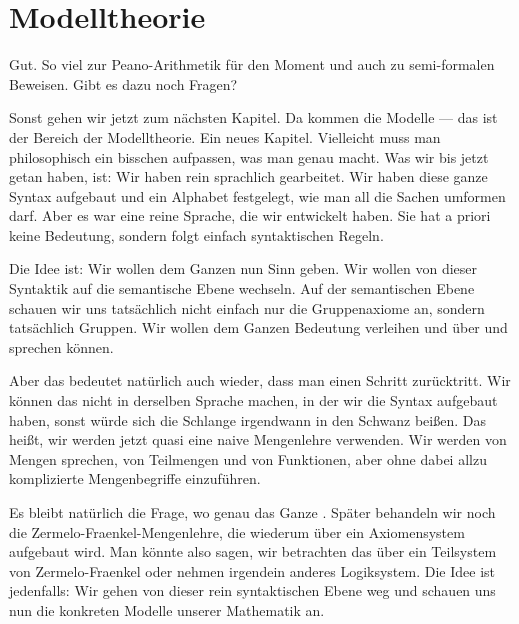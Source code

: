 \section{Modelltheorie}

\begin{spoken-clean}[00:31:45 - 00:33:15]
Gut. So viel zur Peano-Arithmetik für den Moment und auch zu semi-formalen Beweisen. Gibt es dazu noch Fragen?

Sonst gehen wir jetzt zum nächsten Kapitel. Da kommen die Modelle --- das ist der Bereich der Modelltheorie. Ein neues Kapitel.  Vielleicht muss man philosophisch ein bisschen aufpassen, was man genau macht. Was wir bis jetzt getan haben, ist: Wir haben rein sprachlich gearbeitet. Wir haben diese ganze Syntax aufgebaut und ein Alphabet festgelegt, wie man all die Sachen umformen darf. Aber es war eine reine Sprache, die wir entwickelt haben. Sie hat a priori keine Bedeutung, sondern folgt einfach syntaktischen Regeln.
\end{spoken-clean}

\begin{spoken-clean}[00:33:15 - 00:35:40]
Die Idee ist: Wir wollen dem Ganzen nun Sinn geben. Wir wollen von dieser Syntaktik auf die semantische Ebene wechseln. Auf der semantischen Ebene schauen wir uns tatsächlich nicht einfach nur die Gruppenaxiome an, sondern tatsächlich Gruppen. Wir wollen dem Ganzen Bedeutung verleihen und über  und  sprechen können.

Aber das bedeutet natürlich auch wieder, dass man einen Schritt zurücktritt. Wir können das nicht in derselben Sprache machen, in der wir die Syntax aufgebaut haben, sonst würde sich die Schlange irgendwann in den Schwanz beißen. Das heißt, wir werden jetzt quasi eine naive Mengenlehre verwenden. Wir werden von Mengen sprechen, von Teilmengen und von Funktionen, aber ohne dabei allzu komplizierte Mengenbegriffe einzuführen.

Es bleibt natürlich die Frage, wo genau das Ganze . Später behandeln wir noch die Zermelo-Fraenkel-Mengenlehre, die wiederum über ein Axiomensystem aufgebaut wird. Man könnte also sagen, wir betrachten das über ein Teilsystem von Zermelo-Fraenkel oder nehmen irgendein anderes Logiksystem. Die Idee ist jedenfalls: Wir gehen von dieser rein syntaktischen Ebene weg und schauen uns nun die konkreten Modelle unserer Mathematik an.
\end{spoken-clean}

